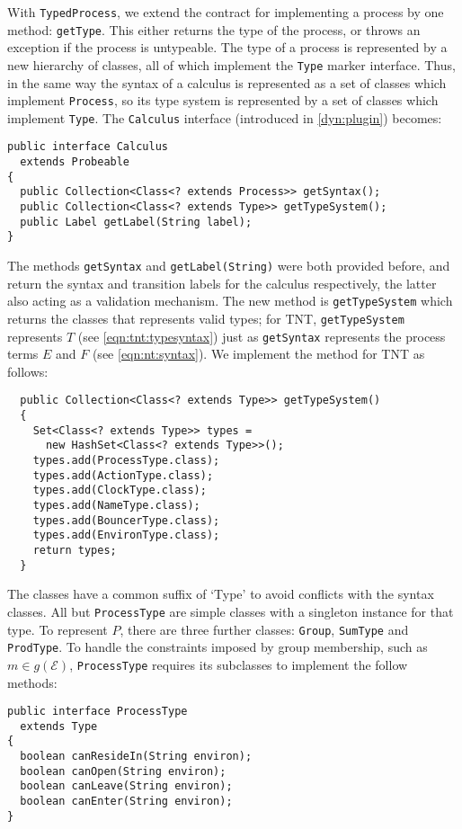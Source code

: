 With \texttt{TypedProcess}, we extend the contract for implementing a
process by one method: \texttt{getType}.  This either returns the type
of the process, or throws an exception if the process is untypeable.
The type of a process is represented by a new hierarchy of classes,
all of which implement the \texttt{Type} marker interface.  Thus, in
the same way the syntax of a calculus is represented as a set of
classes which implement \texttt{Process}, so its type system is
represented by a set of classes which implement \texttt{Type}.  The
\texttt{Calculus} interface (introduced in \ref{dyn:plugin}) becomes:

\begin{verbatim}
public interface Calculus
  extends Probeable
{
  public Collection<Class<? extends Process>> getSyntax();
  public Collection<Class<? extends Type>> getTypeSystem();
  public Label getLabel(String label);
}
\end{verbatim}

The methods \texttt{getSyntax} and \texttt{getLabel(String)} were both
provided before, and return the syntax and transition labels for the
calculus respectively, the latter also acting as a validation
mechanism.  The new method is \texttt{getTypeSystem} which returns the
classes that represents valid types; for TNT, \texttt{getTypeSystem}
represents $T$ (see \ref{eqn:tnt:typesyntax}) just as
\texttt{getSyntax} represents the process terms $E$ and $F$ (see
\ref{eqn:nt:syntax}).  We implement the method for TNT as follows:

\begin{verbatim}
  public Collection<Class<? extends Type>> getTypeSystem()
  {
    Set<Class<? extends Type>> types =
      new HashSet<Class<? extends Type>>();
    types.add(ProcessType.class);
    types.add(ActionType.class);
    types.add(ClockType.class);
    types.add(NameType.class);
    types.add(BouncerType.class);
    types.add(EnvironType.class);
    return types;
  }
\end{verbatim}

The classes have a common suffix of `Type' to avoid conflicts with the
syntax classes.  All but \texttt{ProcessType} are simple classes with
a singleton instance for that type.  To represent $P$, there are three
further classes: \texttt{Group}, \texttt{SumType} and
\texttt{ProdType}.  To handle the constraints imposed by group
membership, such as $m \in g(\mathscr{E})$, \texttt{ProcessType}
requires its subclasses to implement the follow methods:

\begin{verbatim}
public interface ProcessType
  extends Type
{
  boolean canResideIn(String environ);
  boolean canOpen(String environ);
  boolean canLeave(String environ);
  boolean canEnter(String environ);
}
\end{verbatim}


